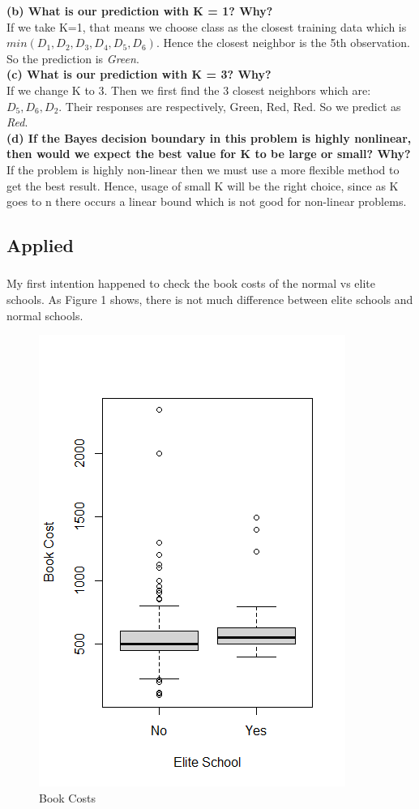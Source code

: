 \documentclass{article}
\begin{document}
\textbf{(b) What is our prediction with K = 1? Why? }\\

If we take K=1, that means we choose class as the closest training data which is $min(D_1,D_2,D_3,D_4,D_5,D_6)$. Hence the closest neighbor is the 5th observation. So the prediction is \textit{Green}. \\ 

\textbf{(c) What is our prediction with K = 3? Why? }\\

If we change K to 3. Then we first find the 3 closest neighbors which are: $D_5, D_6, D_2$. Their responses are respectively, Green, Red, Red. So we predict as \textit{Red}. \\

\textbf{(d) If the Bayes decision boundary in this problem is highly nonlinear, then would we expect the best value for K to be large or
small? Why?} \\

If the problem is highly non-linear then we must use a more flexible method to get the best result. Hence, usage of small K will be the right choice, since as K goes to n there occurs a linear bound which is not good for non-linear problems.

\subsection{Applied}

\subsubsection{}
My first intention happened to check the book costs of the normal vs elite schools. As Figure 1 shows, there is not much difference between elite schools and normal schools.
\begin{figure}[t]
    \centering
    \includegraphics[width=0.5\linewidth]{Book Cost vs Elite School.png}
    \caption{Book Costs}
    \label{fig:enter-label}
\end{figure}
\end{document}
